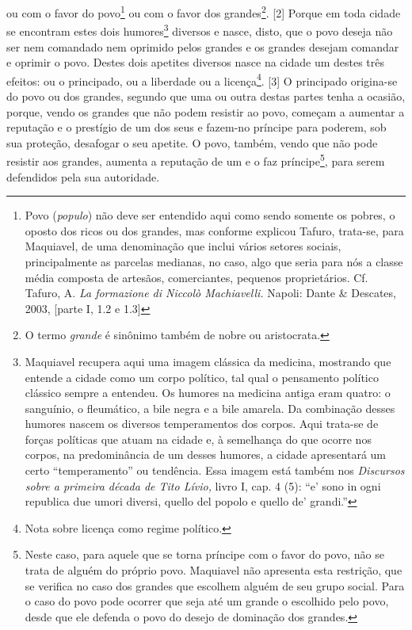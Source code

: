 ou com o favor do povo\footnote{Povo (\emph{populo}) não deve ser
  entendido aqui como sendo somente os pobres, o oposto dos ricos ou dos
  grandes, mas conforme explicou Tafuro, trata-se, para Maquiavel, de
  uma denominação que inclui vários setores sociais, principalmente as
  parcelas medianas, no caso, algo que seria para nós a classe média
  composta de artesãos, comerciantes, pequenos proprietários. Cf.
  Tafuro, A. \emph{La formazione di Niccolò Machiavelli.} Napoli: Dante
  \& Descates, 2003, {[}parte I, 1.2 e 1.3{]}} ou com o favor dos
grandes\footnote{O termo \emph{grande} é sinônimo também de nobre ou
  aristocrata.}. {[}2{]} Porque em toda cidade se encontram estes dois
humores\footnote{Maquiavel recupera aqui uma imagem clássica da
  medicina, mostrando que entende a cidade como um corpo político, tal
  qual o pensamento político clássico sempre a entendeu. Os humores na
  medicina antiga eram quatro: o sanguínio, o fleumático, a bile negra e
  a bile amarela. Da combinação desses humores nascem os diversos
  temperamentos dos corpos. Aqui trata-se de forças políticas que atuam
  na cidade e, à semelhança do que ocorre nos corpos, na predominância
  de um desses humores, a cidade apresentará um certo ``temperamento''
  ou tendência. Essa imagem está também nos \emph{Discursos sobre a
  primeira década de Tito Lívio,} livro I, cap. 4 (5): ``e' sono in ogni
  republica due umori diversi, quello del popolo e quello de' grandi.''}
diversos e nasce, disto, que o povo deseja não ser nem comandado nem
oprimido pelos grandes e os grandes desejam comandar e oprimir o povo.
Destes dois apetites diversos nasce na cidade um destes três efeitos: ou
o principado, ou a liberdade ou a licença\footnote{Nota sobre licença
  como regime político.}. {[}3{]} O principado origina-se do povo ou dos
grandes, segundo que uma ou outra destas partes tenha a ocasião, porque,
vendo os grandes que não podem resistir ao povo, começam a aumentar a
reputação e o prestígio de um dos seus e fazem-no príncipe para poderem,
sob sua proteção, desafogar o seu apetite. O povo, também, vendo que não
pode resistir aos grandes, aumenta a reputação de um e o faz
príncipe\footnote{Neste caso, para aquele que se torna príncipe com o
  favor do povo, não se trata de alguém do próprio povo. Maquiavel não
  apresenta esta restrição, que se verifica no caso dos grandes que
  escolhem alguém de seu grupo social. Para o caso do povo pode ocorrer
  que seja até um grande o escolhido pelo povo, desde que ele defenda o
  povo do desejo de dominação dos grandes.}, para serem defendidos pela
sua autoridade.

